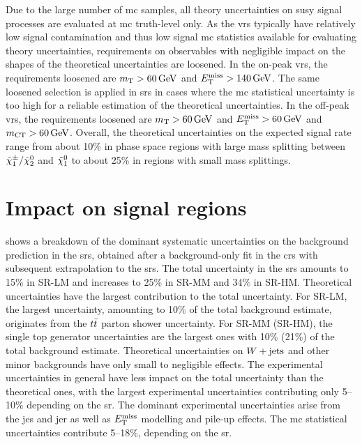 Due to the large number of \gls{mc} samples, all theory uncertainties on \gls{susy} signal processes are evaluated at \gls{mc} truth-level only.   As the \glspl{vr} typically have relatively low signal contamination and thus low signal \gls{mc} statistics available for evaluating theory uncertainties, requirements on observables with negligible impact on the shapes of the theoretical uncertainties are loosened. In the on-peak \glspl{vr}, the requirements loosened are $\mt>\SI{60}{\GeV}$ and $\etmiss > \SI{140}{\GeV}$. The same loosened selection is applied in \glspl{sr} in cases where the \gls{mc} statistical uncertainty is too high for a reliable estimation of the theoretical uncertainties. In the off-peak \glspl{vr}, the requirements loosened are $\mt>\SI{60}{\GeV}$ and $\etmiss>\SI{60}{\GeV}$ and $\mct>\SI{60}{\GeV}$. Overall, the theoretical uncertainties on the expected signal rate range from about 10\% in phase space regions with large mass splitting between $\tilde{\chi}_1^\pm/\tilde{\chi}_2^0$ and $\tilde{\chi}_1^0$ to about 25\% in regions with small mass splittings.
 
 
\section{Impact on signal regions}

 shows a breakdown of the dominant systematic uncertainties on the background prediction in the \glspl{sr}, obtained after a background-only fit in the \glspl{cr} with subsequent extrapolation to the \glspl{sr}. The total uncertainty in the \glspl{sr} amounts to 15\% in SR-LM and increases to 25\% in SR-MM and 34\% in SR-HM. Theoretical uncertainties have the largest contribution to the total uncertainty. For SR-LM, the largest uncertainty, amounting to 10\% of the total background estimate, originates from the $t\bar{t}$ parton shower uncertainty. For SR-MM (SR-HM), the single top generator uncertainties are the largest ones with 10\% (21\%) of the total background estimate. Theoretical uncertainties on $W+\mathrm{jets}$ and other minor backgrounds have only small to negligible effects. The experimental uncertainties in general have less impact on the total uncertainty than the theoretical ones, with the largest experimental uncertainties contributing only 5--10\% depending on the \gls{sr}. The dominant experimental uncertainties arise from the \gls{jes} and \gls{jer} as well as $E_{\textrm{T}}^{\textrm{miss}}$ modelling and pile-up effects. The \gls{mc} statistical uncertainties contribute 5--18\%, depending on the \gls{sr}.  

